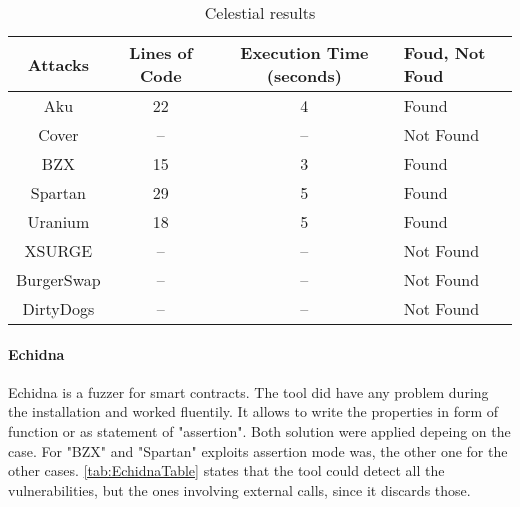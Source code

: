 \begin{center}
    \begin{table*}
        \caption{Celestial results}
            \label{tab:CelestialTable}
                \begin{tabular}{cccl}
                \toprule
                    Attacks & Lines of Code & Execution Time (seconds) & Foud, Not Foud\\
                    \midrule
                    Aku & 22 & 4 & Found\\ 
                    Cover & --  & -- & Not Found \\ 
                    BZX & 15 & 3 & Found\\ 
                    Spartan & 29 &  5 & Found \\ 
                    Uranium & 18 &  5 & Found \\ 
                    XSURGE &  -- & -- & Not Found \\  
                    BurgerSwap &  -- & -- & Not Found\\ 
                    DirtyDogs &  -- & -- & Not Found \\
                \bottomrule
                \end{tabular}
    \end{table*}
        
\end{center}
\paragraph{Echidna} Echidna is a fuzzer for smart contracts. The tool did have any problem during the installation and worked fluentily. 
It allows to write the properties in form of function or as statement of "assertion". Both solution were applied depeing on the case.
For "BZX" and "Spartan" exploits assertion mode was, the other one for the other cases. 
\autoref{tab:EchidnaTable} states that the tool could detect all the vulnerabilities, 
but the ones involving external calls, since it discards those.


